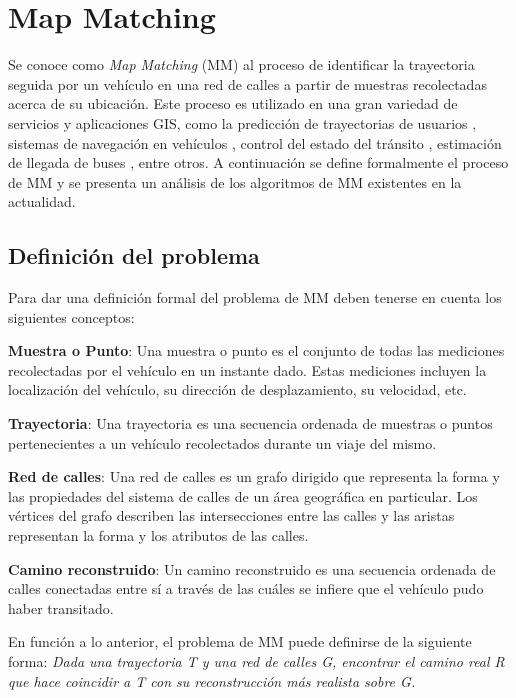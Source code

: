 \chapter{Map Matching}
\label{cap:4}

Se conoce como \emph{Map Matching} (MM) al proceso de identificar la trayectoria seguida por un vehículo en una red de calles a partir de muestras recolectadas acerca de su ubicación. Este proceso es utilizado en una gran variedad de servicios y aplicaciones GIS, como la predicción de trayectorias de usuarios \cite{eisner2011algorithms}, sistemas de navegación en vehículos \cite{kim2001adaptive}, control del estado del tránsito \cite{thiagarajan2009vtrack}, estimación de llegada de buses \cite{thiagarajan2010cooperative}, entre otros. A continuación se define formalmente el proceso de MM y se presenta un análisis de los algoritmos de MM existentes en la actualidad.

\section{Definición del problema}

Para dar una definición formal del problema de MM deben tenerse en cuenta los siguientes conceptos:

\textbf{Muestra o Punto}: Una muestra o punto es el conjunto de todas las mediciones recolectadas por el vehículo en un instante dado. Estas mediciones incluyen la localización del vehículo, su dirección de desplazamiento, su velocidad, etc.

\textbf{Trayectoria}: Una trayectoria es una secuencia ordenada de muestras o puntos pertenecientes a un vehículo recolectados durante un viaje del mismo.

\textbf{Red de calles}: Una red de calles es un grafo dirigido que representa la forma y las propiedades del sistema de calles de un área geográfica en particular. Los vértices del grafo describen las intersecciones entre las calles y las aristas representan la forma y los atributos de las calles.

\textbf{Camino reconstruido}: Un camino reconstruido es una secuencia ordenada de calles conectadas entre sí a través de las cuáles se infiere que el vehículo pudo haber transitado.

En función a lo anterior, el problema de MM puede definirse de la siguiente forma: \emph{Dada una trayectoria T y una red de calles G, encontrar el camino real R que hace coincidir a T con su reconstrucción más realista sobre G.}

